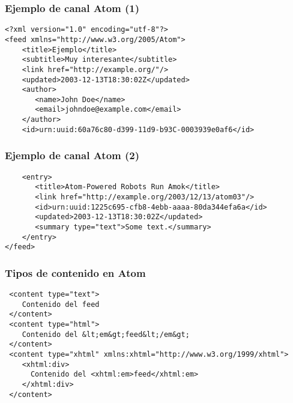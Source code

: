 
\begin{frame}[fragile]
\frametitle{Ejemplo de canal Atom (1)}

\begin{verbatim}
<?xml version="1.0" encoding="utf-8"?>
<feed xmlns="http://www.w3.org/2005/Atom">
    <title>Ejemplo</title>
    <subtitle>Muy interesante</subtitle>
    <link href="http://example.org/"/>
    <updated>2003-12-13T18:30:02Z</updated>
    <author>
       <name>John Doe</name>
       <email>johndoe@example.com</email>
    </author>
    <id>urn:uuid:60a76c80-d399-11d9-b93C-0003939e0af6</id>
\end{verbatim}

\end{frame}


\begin{frame}[fragile]
\frametitle{Ejemplo de canal Atom (2)}

\begin{verbatim}
    <entry>
       <title>Atom-Powered Robots Run Amok</title>
       <link href="http://example.org/2003/12/13/atom03"/>
       <id>urn:uuid:1225c695-cfb8-4ebb-aaaa-80da344efa6a</id>
       <updated>2003-12-13T18:30:02Z</updated>
       <summary type="text">Some text.</summary>
    </entry>
</feed>
\end{verbatim}

\end{frame}


\begin{frame}[fragile]
\frametitle{Tipos de contenido en Atom}

\begin{verbatim}
 <content type="text">
    Contenido del feed
 </content>
 <content type="html">
    Contenido del &lt;em&gt;feed&lt;/em&gt;
 </content>
 <content type="xhtml" xmlns:xhtml="http://www.w3.org/1999/xhtml">
    <xhtml:div>
      Contenido del <xhtml:em>feed</xhtml:em>
    </xhtml:div>
 </content>
\end{verbatim}

\end{frame}



